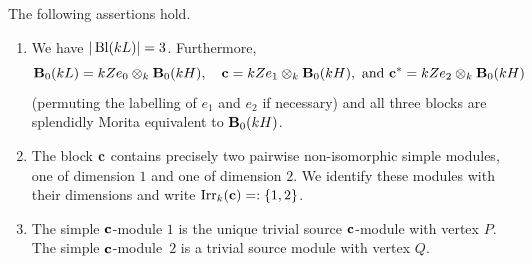 \begin{lem}\label{lem:SplendidlyEquivBrauerCorrespondents}%
The following assertions hold.
\begin{enumerate}[label={\rm(\alph*)}]
    \item
We have  $|\operatorname{Bl}(kL)|=3$. Furthermore, 
    \[    {\mathbf{B}}_0(kL)=kZe_0\otimes_k{\mathbf{B}}_0(kH),\quad {\mathbf{c}}=kZe_1\otimes_k{\mathbf{B}}_0(kH),\text{ and } {\mathbf{c}}^\ast=kZe_2\otimes_k{\mathbf{B}}_0(kH)
    \]
    (permuting the labelling of $e_1$ and $e_2$ if necessary)  
    and all three blocks are splendidly Morita equivalent to ${\mathbf{B}}_0(kH)$.   
    \item The block ${\mathbf{c}}$ contains precisely two pairwise non-isomorphic simple modules, one of dimension $1$ and one of dimension $2$. We identify these modules with their dimensions and write $\operatorname{Irr}_k({\mathbf{c}})=:\{1,2\}$.
    \item 
    The simple ${\mathbf{c}}$-module $1$ is the unique trivial source ${\mathbf{c}}$-module with vertex $P$.
    The simple ${\mathbf{c}}$-module~$2$ is a trivial source module with vertex $Q$. 
\end{enumerate}    
\end{lem}

